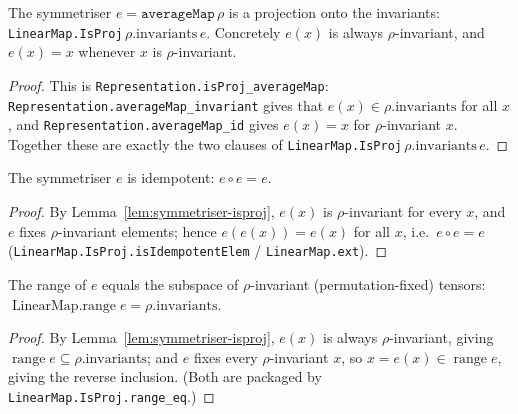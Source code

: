 \begin{lemma}
    \label{lem:symmetriser-isproj}
    The symmetriser $e = \texttt{averageMap}\,\rho$ is a projection onto the invariants:
    \texttt{LinearMap.IsProj}\,$\rho.\mathrm{invariants}\,e$. Concretely $e(x)$ is always
    $\rho$-invariant, and $e(x) = x$ whenever $x$ is $\rho$-invariant.
\end{lemma}
\begin{proof}
    This is \texttt{Representation.isProj\_averageMap}: \texttt{Representation.averageMap\_invariant} gives
    that $e(x) \in \rho.\mathrm{invariants}$ for all $x$, and \texttt{Representation.averageMap\_id} gives
    $e(x) = x$ for $\rho$-invariant $x$. Together these are exactly the two clauses of
    \texttt{LinearMap.IsProj}\,$\rho.\mathrm{invariants}\,e$.
\end{proof}

\begin{lemma}
    \label{lem:symmetriser-idempotent}
    \leanok
    The symmetriser $e$ is idempotent: $e \circ e = e$.
\end{lemma}
\begin{proof}
    By Lemma~\ref{lem:symmetriser-isproj}, $e(x)$ is $\rho$-invariant for every $x$, and $e$ fixes
    $\rho$-invariant elements; hence $e(e(x)) = e(x)$ for all $x$, i.e.\ $e \circ e = e$
    (\texttt{LinearMap.IsProj.isIdempotentElem} / \texttt{LinearMap.ext}).
\end{proof}

\begin{lemma}
    \label{lem:symmetriser-range-invariants}
    The range of $e$ equals the subspace of $\rho$-invariant (permutation-fixed) tensors:
    $\operatorname{LinearMap.range} e = \rho.\mathrm{invariants}$.
\end{lemma}
\begin{proof}
    By Lemma~\ref{lem:symmetriser-isproj}, $e(x)$ is always $\rho$-invariant, giving
    $\operatorname{range} e \subseteq \rho.\mathrm{invariants}$; and $e$ fixes every $\rho$-invariant $x$,
    so $x = e(x) \in \operatorname{range} e$, giving the reverse inclusion. (Both are packaged by
    \texttt{LinearMap.IsProj.range\_eq}.)
\end{proof}

